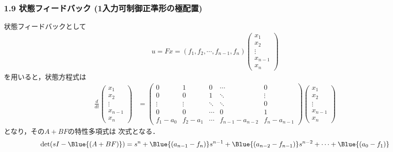 \begin{frame}[t]
\frametitle{1.9 状態フィードバック (1入力可制御正準形の極配置)}
状態フィードバックとして
\small{
\begin{align}
 u = F x =
 (f_1, f_2, \cdots, f_{n-1}, f_{n})
 \left(\begin{array}{c}
        x_1 \\
    x_2 \\
    \vdots \\
    x_{n-1} \\
    x_n
       \end{array}\right)
\end{align}
}
を用いると，状態方程式は
\small{
\begin{align}
 \frac{d}{dt}
  \left(\begin{array}{c}
         x_1 \\
   x_2 \\
   \vdots \\
   x_{n-1} \\
   x_n
  \end{array}\right)
  &=
  \left(\begin{array}{ccccc}
     0      & 1      & 0      & \cdots & 0 \\
   0      & 0      & 1      & \ddots & \vdots \\
   \vdots & \vdots & \ddots & \ddots & 0 \\
   0      & 0      & \cdots & 0      & 1 \\
   f_1-a_0   & f_2 -a_1   & \cdots & f_{n-1} -a_{n-2} & f_{n} -a_{n-1}
  \end{array}\right)
  \left(\begin{array}{c}
   x_1 \\
   x_2 \\
   \vdots \\
   x_{n-1} \\
   x_n
  \end{array}\right)
\end{align}
}
となり，その$A+BF$の特性多項式は
次式となる．
\begin{equation}
 \det (sI-\Blue{(A+BF)}) = s^n + \Blue{(a_{n-1}-f_n)} s^{n-1}
  + \Blue{(a_{n-2}-f_{n-1})} s^{n-2} + \cdots 
  + \Blue{(a_0-f_1)}
\label{eq:poleas_cha1}
\end{equation}
\end{frame}


